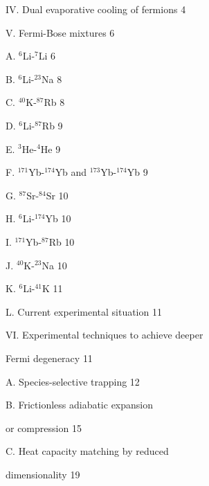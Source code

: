 \documentclass[pra,letterpaper,twocolumn,showpacs,superscriptaddress]{revtex4}
\begin{document}
IV. Dual evaporative cooling of fermions \hfill{4}

V. Fermi-Bose mixtures \hfill{6}

\hspace{1.0cm} A. ${}^6$Li-${}^7$Li \hfill{6}

\hspace{1.0cm} B. ${}^6$Li-${}^{23}$Na \hfill{8}

\hspace{1.0cm} C. ${}^{40}$K-${}^{87}$Rb \hfill{8}

\hspace{1.0cm} D. ${}^6$Li-${}^{87}$Rb \hfill{9}

\hspace{1.0cm} E. ${}^{3}$He-${}^{4}$He \hfill{9}

\hspace{1.0cm} F. ${}^{171}$Yb-${}^{174}$Yb and ${}^{173}$Yb-${}^{174}$Yb \hfill{9}

\hspace{1.0cm} G. ${}^{87}$Sr-${}^{84}$Sr \hfill{10}

\hspace{1.0cm} H. ${}^{6}$Li-${}^{174}$Yb \hfill{10}

\hspace{1.0cm} I. ${}^{171}$Yb-${}^{87}$Rb \hfill{10}

\hspace{1.0cm} J. ${}^{40}$K-${}^{23}$Na \hfill{10}

\hspace{1.0cm} K.  ${}^{6}$Li-${}^{41}$K \hfill{11}

\hspace{1.0cm} L. Current experimental situation  \hfill{11}

VI. Experimental techniques to achieve deeper

\hspace{1.0cm}Fermi degeneracy \hfill{11}

\hspace{1.0cm} A. Species-selective trapping \hfill{12}

\hspace{1.0cm} B. Frictionless adiabatic expansion 

\hspace{1.5cm}or compression \hfill{15}

\hspace{1.0cm} C. Heat capacity matching by reduced 

\hspace{1.5cm}dimensionality \hfill{19}
\end{document}
